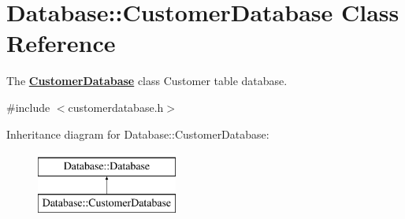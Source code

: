 \hypertarget{classDatabase_1_1CustomerDatabase}{\section{Database\+:\+:Customer\+Database Class Reference}
\label{classDatabase_1_1CustomerDatabase}
}


The {\bfseries \hyperlink{classDatabase_1_1CustomerDatabase}{Customer\+Database}} class Customer table database.  




{\ttfamily \#include $<$customerdatabase.\+h$>$}

Inheritance diagram for Database\+:\+:Customer\+Database\+:\begin{figure}[H]
\begin{center}
\leavevmode
\includegraphics[height=2.000000cm]{de/de4/classDatabase_1_1CustomerDatabase}
\end{center}
\end{figure}
